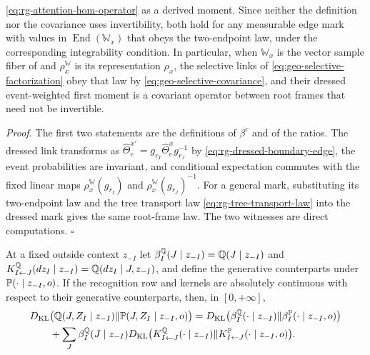 \eqref{eq:rg-attention-hom-operator} as a derived moment. Since neither the
definition nor the covariance uses invertibility, both hold for any measurable edge
mark with values in $\operatorname{End}(\mathbb W_x)$ that obeys the two-endpoint law, under
the corresponding integrability condition. In particular, when $\mathbb W_x$ is the
vector sample fiber of  and $\rho^{\mathbb W}_x$ is its
representation $\rho_x$,
the selective links of \eqref{eq:geo-selective-factorization} obey that law by
\eqref{eq:geo-selective-covariance}, and their dressed event-weighted first moment is
a covariant operator between root frames that need not be invertible.

\noindent\emph{Proof.}
The first two statements are the definitions of $\beta^c$ and of the ratios. The
dressed link transforms as $\widehat\Theta^{x\prime}_e=g_{r_I}\widehat\Theta^x_eg_{r_J}^{-1}$
by \eqref{eq:rg-dressed-boundary-edge}, the event probabilities are invariant, and
conditional expectation commutes with the fixed linear maps $\rho^{\mathbb W}_x(g_{r_I})$ and
$\rho^{\mathbb W}_x(g_{r_J})^{-1}$. For a general mark, substituting its two-endpoint law and the tree
transport law \eqref{eq:rg-tree-transport-law} into the dressed mark gives the same
root-frame law. The two witnesses are direct computations. $\square$

At a fixed outside context $z_{-I}$ let
$\beta^{\mathbb Q}_I(J\mid z_{-I})=\mathbb Q(J\mid z_{-I})$ and
$K^{\mathbb Q}_{I\leftarrow J}(dz_I\mid z_{-I})=\mathbb Q(dz_I\mid J,z_{-I})$, and
define the generative counterparts under $\mathbb P(\cdot\mid z_{-I},o)$. If the
recognition row and kernels are absolutely continuous with respect to their
generative counterparts, then, in $[0,+\infty]$,
\begin{equation}
\begin{aligned}
&D_{\mathrm{KL}}\bigl(\mathbb Q(J,Z_I\mid z_{-I})\Vert\mathbb P(J,Z_I\mid z_{-I},o)\bigr)
=D_{\mathrm{KL}}\bigl(\beta^{\mathbb Q}_I(\cdot\mid z_{-I})\Vert\beta^{\mathbb P}_I(\cdot\mid z_{-I},o)\bigr)\\
&\qquad+\sum_J\beta^{\mathbb Q}_I(J\mid z_{-I})
D_{\mathrm{KL}}\bigl(K^{\mathbb Q}_{I\leftarrow J}(\cdot\mid z_{-I})\Vert K^{\mathbb P}_{I\leftarrow J}(\cdot\mid z_{-I},o)\bigr).
\end{aligned}
\label{eq:rg-meta-attention-kl-split}
\end{equation}

